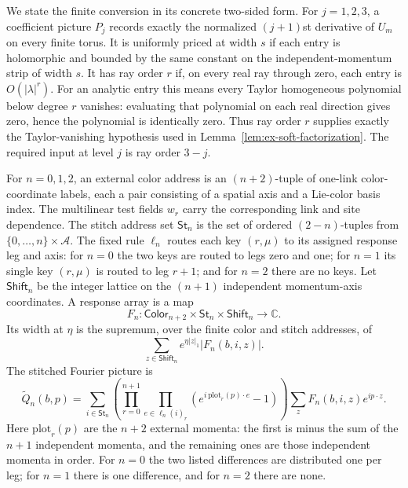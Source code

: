 We state the finite conversion in its concrete two-sided form. For
$j=1,2,3$, a coefficient picture $P_j$ records exactly the normalized
$(j+1)$st derivative of $U_m$ on every finite torus. It is uniformly
priced at width $s$ if each entry is holomorphic and bounded by the same
constant on the independent-momentum strip of width $s$. It has ray
order $r$ if, on every real ray through zero, each entry is
$O(|\lambda|^r)$. For an analytic entry this means every Taylor
homogeneous polynomial below degree $r$ vanishes: evaluating that
polynomial on each real direction gives zero, hence the polynomial is
identically zero. Thus ray order $r$ supplies exactly the
Taylor-vanishing hypothesis used in Lemma~\ref{lem:ex-soft-factorization}.
The required input at level $j$ is ray order $3-j$.

For $n=0,1,2$, an external color address is an $(n+2)$-tuple of
one-link color-coordinate labels, each a pair consisting of a spatial
axis and a Lie-color basis index. The multilinear test fields $w_r$
carry the corresponding link and site dependence.
The stitch address set $\mathsf{St}_n$ is the set of ordered
$(2-n)$-tuples from $\{0,\ldots,n\}\times\mathcal A$. The fixed rule
$\ell_n$ routes each key $(r,\mu)$ to its assigned response leg and axis:
for $n=0$ the two keys are routed to legs zero and one; for $n=1$ its
single key $(r,\mu)$ is routed to leg $r+1$; and for $n=2$ there are no
keys. Let $\mathsf{Shift}_n$ be the integer lattice on the $(n+1)$
independent momentum-axis coordinates. A response
array is a map
\[
 F_n:\mathsf{Color}_{n+2}\times\mathsf{St}_n\times
       \mathsf{Shift}_n\longrightarrow\mathbb C.
\]
Its width at $\eta$ is the supremum, over the finite color and stitch
addresses, of
\[
 \sum_{z\in\mathsf{Shift}_n}e^{\eta|z|_1}|F_n(b,i,z)|.
\]
The stitched Fourier picture is
\begin{equation}
 \widetilde Q_n(b,p)=\sum_{i\in\mathsf{St}_n}
  \left(\prod_{r=0}^{n+1}\prod_{e\in\ell_n(i)_r}
       (e^{i\,\mathrm{plot}_r(p)\cdot e}-1)\right)
       \sum_z F_n(b,i,z)e^{ip\cdot z}.
 \label{eq:soft-curvature-receipts-display-SR1}
\end{equation}
Here $\mathrm{plot}_r(p)$ are the $n+2$ external momenta: the first is
minus the sum of the $n+1$ independent momenta, and the remaining ones
are those independent momenta in order. For $n=0$ the two listed
differences are distributed one per leg; for $n=1$ there is one
difference, and for $n=2$ there are none.

